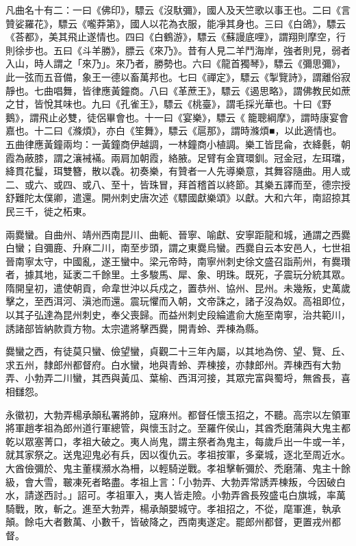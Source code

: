 \begin{pinyinscope}
 凡曲名十有二：一曰《佛印》，驃云《沒馱彌》，國人及天竺歌以事王也。二曰《言贊娑羅花》，驃云《嚨莽第》，國人以花為衣服，能凈其身也。三曰《白鴿》，驃云《荅都》，美其飛止遂情也。四曰《白鶴游》，驃云《蘇謾底哩》，謂翔則摩空，行則徐步也。五曰《斗羊勝》，膘云《來乃》。昔有人見二羊鬥海岸，強者則見，弱者入山，時人謂之「來乃」。來乃者，勝勢也。六曰《龍首獨琴》，驃云《彌思彌》，此一弦而五音備，象王一德以畜萬邦也。七曰《禪定》，驃云《掣覽詩》，謂離俗寂靜也。七曲唱舞，皆律應黃鐘商。八曰《革蔗王》，驃云《遏思略》，謂佛教民如蔗之甘，皆悅其味也。九曰《孔雀王》，驃云《桃臺》，謂毛採光華也。十曰《野鵝》，謂飛止必雙，徒侶畢會也。十一曰《宴樂》，驃云《籠聰綱摩》，謂時康宴會嘉也。十二曰《滌煩》，亦白《笙舞》，驃云《扈那》，謂時滌煩■，以此適情也。五曲律應黃鐘兩均：一黃鐘商伊越調，一林鐘商小植調。樂工皆昆侖，衣絳氎，朝霞為蔽膝，謂之瀼裓襔。兩肩加朝霞，絡腋。足臂有金寶環釧。冠金冠，左珥璫，絳貫花鬘，珥雙簪，散以毳。初奏樂，有贊者一人先導樂意，其舞容隨曲。用人或二、或六、或四、或八、至十，皆珠冒，拜首稽首以終節。其樂五譯而至，德宗授舒難陀太僕卿，遣還。開州刺史唐次述《驃國獻樂頌》以獻。大和六年，南詔掠其民三千，徙之柘東。



 兩爨蠻。自曲州、靖州西南昆川、曲軛、晉寧、喻獻、安寧距龍和城，通謂之西爨白蠻；自彌鹿、升麻二川，南至步頭，謂之東爨烏蠻。西爨自云本安邑人，七世祖晉南寧太守，中國亂，遂王蠻中。梁元帝時，南寧州刺史徐文盛召詣荊州，有爨瓚者，據其地，延袤二千餘里。土多駿馬、犀、象、明珠。既死，子震玩分統其眾。隋開皇初，遣使朝貢，命韋世沖以兵戍之，置恭州、協州、昆州。未幾叛，史萬歲擊之，至西洱河、滇池而還。震玩懼而入朝，文帝誅之，諸子沒為奴。高祖即位，以其子弘達為昆州刺史，奉父喪歸。而益州刺史段綸遣俞大施至南寧，治共範川，誘諸部皆納款貢方物。太宗遣將擊西爨，開青蛉、弄棟為縣。



 爨蠻之西，有徒莫只蠻、儉望蠻，貞觀二十三年內屬，以其地為傍、望、覽、丘、求五州，隸郎州都督府。白水蠻，地與青蛉、弄棟接，亦隸郎州。弄棟西有大勃弄、小勃弄二川蠻，其西與黃瓜、葉榆、西洱河接，其眾完富與蜀埒，無酋長，喜相讎怨。



 永徽初，大勃弄楊承顛私署將帥，寇麻州。都督任懷玉招之，不聽。高宗以左領軍將軍趙孝祖為郎州道行軍總管，與懷玉討之。至羅仵侯山，其酋禿磨蒲與大鬼主都乾以眾塞菁口，孝祖大破之。夷人尚鬼，謂主祭者為鬼主，每歲戶出一牛或一羊，就其家祭之。送鬼迎鬼必有兵，因以復仇云。孝祖按軍，多棄城，逐北至周近水。大酋儉彌於、鬼主董樸瀕水為柵，以輕騎逆戰。孝祖擊斬彌於、禿磨蒲、鬼主十餘級，會大雪，皸凍死者略盡。孝祖上言：「小勃弄、大勃弄常誘弄棟叛，今因破白水，請遂西討。」詔可。孝祖軍入，夷人皆走險。小勃弄酋長歿盛屯白旗城，率萬騎戰，敗，斬之。進至大勃弄，楊承顛嬰城守。孝祖招之，不從，麾軍進，執承顛。餘屯大者數萬、小數千，皆破降之，西南夷遂定。罷郎州都督，更置戎州都督。




\end{pinyinscope}

